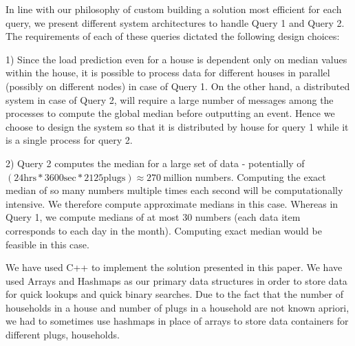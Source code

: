 In line with our philosophy of custom building a solution most efficient for each query, we present different system architectures to handle Query 1 and Query 2.
The requirements of each of these queries dictated the following design choices:

1) Since the load prediction even for a house is dependent only on median values within the house, it is possible to process data for different houses in parallel (possibly on different nodes) in case of Query 1.
On the other hand, a distributed system in case of Query 2, will require a large number of messages among the processes to compute the global median before outputting an event.
Hence we choose to design the system so that it is distributed by house for query 1 while it is a single process for query 2.

2) Query 2 computes the median for a large set of data - potentially  of $(24 \mbox{hrs} * 3600 \mbox{sec} * 2125 \mbox{plugs}) \approx 270 \ \mbox{million}$ numbers.
Computing the exact median of so many numbers multiple times each second will be computationally intensive.
We therefore compute approximate medians in this case.
Whereas in Query 1, we compute medians of at most 30 numbers (each data item corresponds to each day in the month).
Computing exact median would be feasible in this case.

We have used C++ to implement the solution presented in this paper.
We have used Arrays and Hashmaps as our primary data structures in order to store data for quick lookups and quick binary searches.
Due to the fact that the number of households in a house and number of plugs in a household are not known apriori, we had to sometimes use hashmaps in place of arrays to store data containers for different plugs, households.
